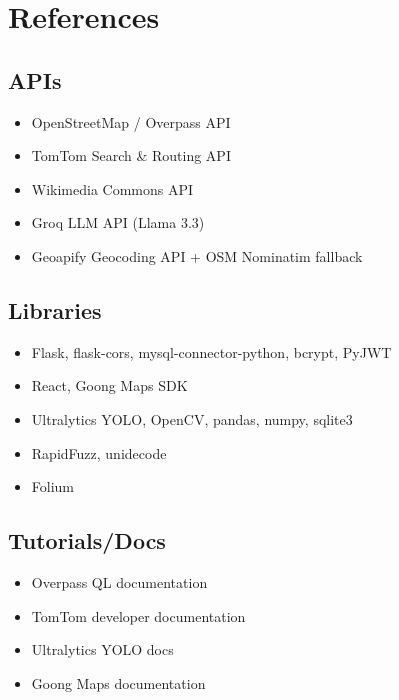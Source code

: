 \chapter{References}
\label{chap:references}
\section*{APIs}
\begin{itemize}
  \item OpenStreetMap / Overpass API
  \item TomTom Search \& Routing API
  \item Wikimedia Commons API
  \item Groq LLM API (Llama 3.3)
  \item Geoapify Geocoding API + OSM Nominatim fallback
\end{itemize}

\section*{Libraries}
\begin{itemize}
  \item Flask, flask-cors, mysql-connector-python, bcrypt, PyJWT
  \item React, Goong Maps SDK
  \item Ultralytics YOLO, OpenCV, pandas, numpy, sqlite3
  \item RapidFuzz, unidecode
  \item Folium
\end{itemize}

\section*{Tutorials/Docs}
\begin{itemize}
  \item Overpass QL documentation
  \item TomTom developer documentation
  \item Ultralytics YOLO docs
  \item Goong Maps documentation
\end{itemize}
